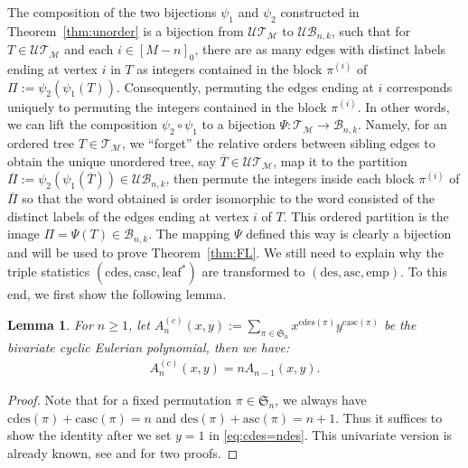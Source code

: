 \documentclass[11pt,reqno]{amsart}
\numberwithin{equation}{section}
\theoremstyle{plain}
\newtheorem{lemma}[theorem]{Lemma}
\theoremstyle{definition}
\newcommand{\s}{\mathfrak{S}}
\newcommand{\M}{\mathcal{M}}
\newcommand{\T}{\mathcal{T}}
\newcommand{\B}{\mathcal{B}}
\newcommand{\UT}{\mathcal{UT}}
\newcommand{\UB}{\mathcal{UB}}
\def\des{\mathrm{des}}
\def\asc{\mathrm{asc}}
\def\cdes{\mathrm{cdes}}
\def\casc{\mathrm{casc}}
\def\lleaf{\mathrm{leaf}^*}
\def\emp{\mathrm{emp}}
\begin{document}
The composition of the two bijections $\psi_1$ and $\psi_2$ constructed in Theorem~\ref{thm:unorder} is a bijection from $\UT_{\M}$ to $\UB_{n,k}$, such that for $T\in\UT_{\M}$ and each $i\in[M-n]_0$, there are as many edges with distinct labels ending at vertex $i$ in $T$ as integers contained in the block $\pi^{(i)}$ of $\Pi:=\psi_2(\psi_1(T))$. Consequently, permuting the edges ending at $i$ corresponds uniquely to permuting the integers contained in the block $\pi^{(i)}$. In other words, we can lift the composition $\psi_2\circ\psi_1$ to a bijection $\Psi:\T_{\M}\rightarrow \B_{n,k}$. Namely, for an ordered tree $T\in\T_{\M}$, we ``forget'' the relative orders between sibling edges to obtain the unique unordered tree, say $\overline{T}\in\UT_{\M}$, map it to the partition $\overline{\Pi}:=\psi_2(\psi_1(\overline{T}))\in\UB_{n,k}$, then permute the integers inside each block $\pi^{(i)}$ of $\overline{\Pi}$ so that the word obtained is order isomorphic to the word consisted of the distinct labels of the edges ending at vertex $i$ of $T$. This ordered partition is the image $\Pi=\Psi(T)\in\B_{n,k}$. The mapping $\Psi$ defined this way is clearly a bijection and will be used to prove Theorem~\ref{thm:FL}. We still need to explain why the triple statistics $(\cdes,\casc,\lleaf)$ are transformed to $(\des,\asc,\emp)$. To this end, we first show the following lemma. 

\begin{lemma}
For $n\ge 1$, let $A_n^{(c)}(x,y):=\sum_{\pi\in\s_n}x^{\cdes(\pi)}y^{\casc(\pi)}$ be the bivariate cyclic Eulerian polynomial, then we have:
\begin{align}\label{eq:cdes=ndes}
A_n^{(c)}(x,y)=nA_{n-1}(x,y).
\end{align}
\end{lemma}
\begin{proof}
Note that for a fixed permutation $\pi\in\s_n$, we always have $\cdes(\pi)+\casc(\pi)=n$ and $\des(\pi)+\asc(\pi)=n+1$. Thus it suffices to show the identity after we set $y=1$ in \eqref{eq:cdes=ndes}. This univariate version is already known, see \cite[Coro.~1]{Ful} and \cite[Prop.~1.1]{Pet} for two proofs. 
\end{proof}
\end{document}

